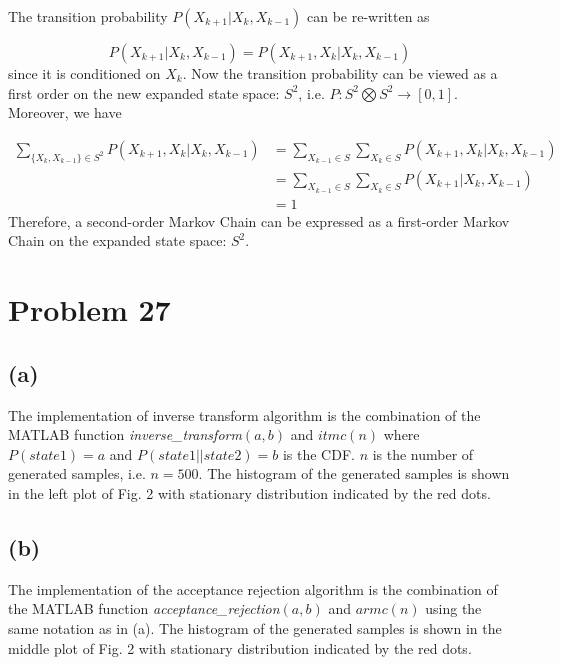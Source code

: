 \documentclass[a4paper, 11pt]{article}
\begin{document}
The transition probability $P(X_{k+1}|X_k, X_{k-1})$ can be re-written as

\begin{equation}
P(X_{k+1}|X_k, X_{k-1}) = P(X_{k+1}, X_k|X_k, X_{k-1})
\end{equation}
since it is conditioned on $X_k$. Now the transition probability can be viewed as a first order on the new expanded state space: $S^2$, i.e. $P: {S^2 \bigotimes  S^2} \to [0, 1]$. Moreover, we have 

\begin{equation}
\begin{split}
\sum_{\{X_k, X_{k-1}\}\in S^2} P(X_{k+1}, X_k|X_k, X_{k-1}) & = \sum_{X_{k-1}\in S}\sum_{X_k\in S} P(X_{k+1}, X_k|X_k, X_{k-1}) \\
 & = \sum_{X_{k-1}\in S}\sum_{X_k\in S} P(X_{k+1}|X_k, X_{k-1})\\
 & = 1
\end{split}
\end{equation}
Therefore, a second-order Markov Chain can be expressed as a first-order Markov Chain on the expanded state space: $S^2$. 


\section*{Problem 27}

\subsection*{(a)}

The implementation of inverse transform algorithm is the combination of the MATLAB function \textit{inverse\_transform$(a,b)$} and \textit{$itmc(n)$} where $P(state 1) = a$ and $P(state 1 || state 2) = b$ is the CDF. $n$ is the number of generated samples, i.e. $n=500$. The histogram of the generated samples is shown in the left plot of Fig. 2 with stationary distribution indicated by the red dots. 

\subsection*{(b)}

The implementation of the acceptance rejection algorithm is the combination of the MATLAB function \textit{acceptance\_rejection$(a,b)$} and \textit{$armc(n)$} using the same notation as in (a). The histogram of the generated samples is shown in the middle plot of Fig. 2 with stationary distribution indicated by the red dots. 
\end{document}
